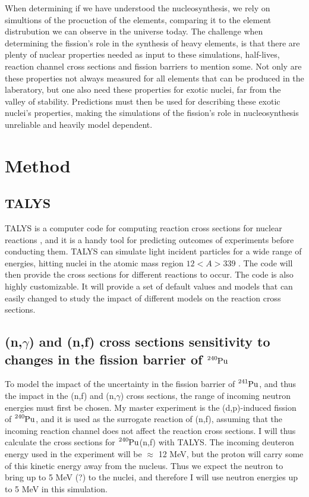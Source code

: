\documentclass[]{article}
\begin{document}
When determining if we have understood the nucleosynthesis, we rely on simultions of the procuction of the elements, comparing it to the element distrubution we can observe in the universe today.  The challenge when determining the fission's role in the synthesis of heavy elements, is that there are plenty of nuclear properties needed as input to these simulations, half-lives, reaction channel cross sections and fission barriers to mention some. Not only are these properties not always measured for all elements that can be produced in the laberatory, but one also need these properties for exotic nuclei, far from the valley of stability. Predictions must then be used for describing these exotic nuclei's properties, making the simulations of the fission's role in nucleosynthesis unreliable and heavily model dependent. 

\section{Method}

\subsection{TALYS}

TALYS is a computer code for computing reaction cross sections for nuclear reactions \cite{TALYSmanual}, and it is a handy tool for predicting outcomes of experiments before conducting them. TALYS can simulate light incident particles for a wide range of energies, hitting nuclei in the atomic mass region $12<A>339$ \cite{TALYSmanual}. The code will then provide the cross sections for different reactions to occur. The code is also highly customizable. It will provide a set of default values and models that can easily changed to study the impact of different models on the reaction cross sections.

\subsection{(n,$\gamma$) and (n,f) cross sections sensitivity to changes in the fission barrier of $\ce{^{240}Pu}$}


To model the impact of the uncertainty in the fission barrier of $\ce{^{241}Pu}$, and thus the impact in the (n,f) and (n,$\gamma$) cross sections, the range of incoming neutron energies must first be chosen. My master experiment is the (d,p)-induced fission of $\ce{^{240}Pu}$, and it is used as the surrogate reaction of (n,f), assuming that the incoming reaction channel does not affect the reaction cross sections. I will thus calculate the cross sections for $\ce{^{240}Pu}$(n,f) with TALYS. The incoming deuteron energy used in the experiment will be $\approx$ 12 MeV, but the proton will carry some of this kinetic energy away from the nucleus. Thus we expect the neutron to bring up to 5 MeV (?) to the nuclei, and therefore I will use neutron energies up to 5 MeV in this simulation. 
\par 
\vspace{3mm}
\end{document}
